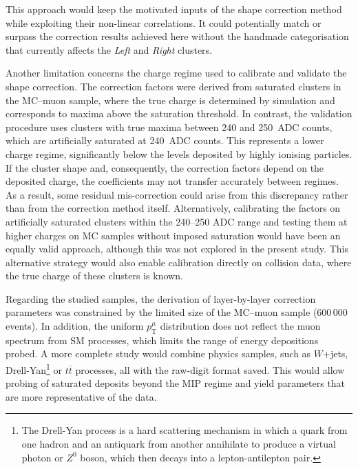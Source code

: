 This approach would keep the motivated inputs of the shape correction method while exploiting their non-linear correlations. It could potentially match or surpass the correction results achieved here without the handmade categorisation that currently affects the \textit{Left} and \textit{Right} clusters.

\vspace{0.5 cm}

Another limitation concerns the charge regime used to calibrate and validate the shape correction. The correction factors were derived from saturated clusters in the MC--muon sample, where the true charge is determined by simulation and corresponds to maxima above the saturation threshold. In contrast, the validation procedure uses clusters with true maxima between 240 and 250~ADC counts, which are artificially saturated at 240~ADC counts. This represents a lower charge regime, significantly below the levels deposited by highly ionising particles. If the cluster shape and, consequently, the correction factors depend on the deposited charge, the coefficients may not transfer accurately between regimes. As a result, some residual mis-correction could arise from this discrepancy rather than from the correction method itself. Alternatively, calibrating the factors on artificially saturated clusters within the 240–250 ADC range and testing them at higher charges on MC samples without imposed saturation would have been an equally valid approach, although this was not explored in the present study. This alternative strategy would also enable calibration directly on collision data, where the true charge of these clusters is known.

\vspace{0.5 cm}

Regarding the studied samples, the derivation of layer-by-layer correction parameters was constrained by the limited size of the MC--muon sample (600\,000 events). In addition, the uniform $p_{\mathrm{T}}^\mu$ distribution does not reflect the muon spectrum from SM processes, which limits the range of energy depositions probed. A more complete study would combine physics samples, such as $W$+jets, Drell-Yan\footnote{The Drell-Yan process is a hard scattering mechanism in which a quark from one hadron and an antiquark from another annihilate to produce a virtual photon or $Z^0$ boson, which then decays into a lepton-antilepton pair.} or $t\overline{t}$ processes, all with the raw-digit format saved. This would allow probing of saturated deposits beyond the MIP regime and yield parameters that are more representative of the data.

